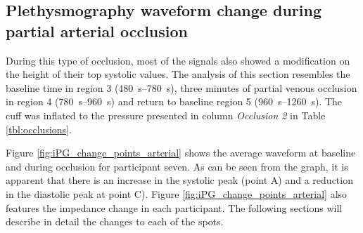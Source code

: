 \subsection{Plethysmography waveform change during partial arterial occlusion}
\label{section results 3.2}
During this type of occlusion, most of the signals also showed a modification on the height of their top systolic values. The analysis of this section resembles the baseline time in region 3 (\SIrange{480}{780}{\second}), three minutes of partial venous occlusion in region 4 (\SIrange{780}{960}{\second}) and return to baseline region 5 (\SIrange{960}{1260}{\second}). The cuff was inflated to the pressure presented in column \textit{Occlusion 2} in Table \ref{tbl:occlusions}. 

Figure \ref{fig:iPG_change_points_arterial} shows the average waveform at baseline and during occlusion for participant seven. As can be seen from the graph, it is apparent that there is an increase in the systolic peak (point A) and a reduction in the diastolic peak at point C). Figure \ref{fig:iPG_change_points_arterial} also features the impedance change in each participant. The following sections will describe in detail the changes to each of the spots. 

